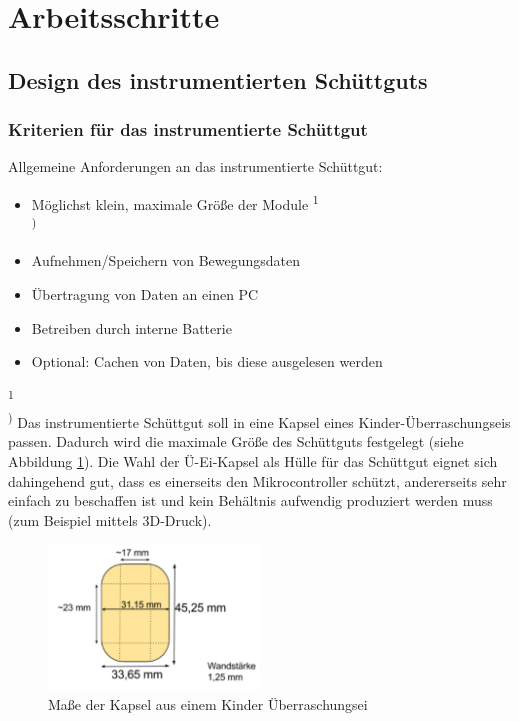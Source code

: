 \section{Arbeitsschritte}
 
\subsection{Design des instrumentierten Schüttguts}
\subsubsection{Kriterien für das instrumentierte Schüttgut}

Allgemeine Anforderungen an das instrumentierte Schüttgut:

\begin{itemize}
	\item Möglichst klein, maximale Größe der Module \textsuperscript{1\\)}
	\item Aufnehmen/Speichern von Bewegungsdaten
	\item Übertragung von Daten an einen PC
	\item Betreiben durch interne Batterie
	\item Optional: Cachen von Daten, bis diese ausgelesen werden 
\end{itemize}

\textsuperscript{1\\)} Das instrumentierte Schüttgut soll in eine Kapsel eines Kinder-Überraschungseis passen. Dadurch wird die maximale Größe des Schüttguts festgelegt (siehe Abbildung \ref{fig:k3}). Die Wahl der Ü-Ei-Kapsel als Hülle für das Schüttgut eignet sich dahingehend gut, dass es einerseits den Mikrocontroller schützt, andererseits sehr einfach zu beschaffen ist und kein Behältnis aufwendig produziert werden muss (zum Beispiel mittels 3D-Druck).

\begin{figure}[ht]
	\centering
	\includegraphics[width=0.5\textwidth]{images/k3-ueei.PNG}
	\caption {Maße der Kapsel aus einem Kinder Überraschungsei}
	\label{fig:k3}
\end{figure}

